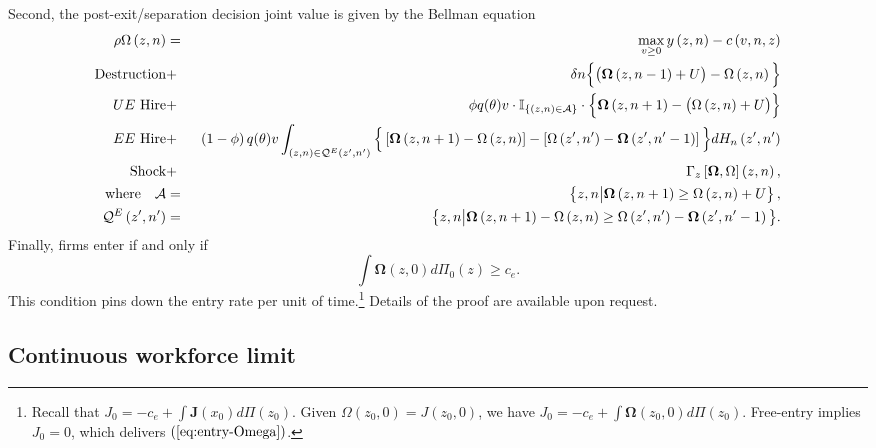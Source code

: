 Second, the post-exit/separation decision joint value is given by the
Bellman equation
\begin{eqnarray*}
\rho \Omega \left( z,n\right) &=& \max_{v\geq 0} y\left( z,n\right) -c\left(
v,n,z\right)  \label{eq:D_omega2} \\
\text{Destruction} &+&\:\:\delta n\Big\{ \big(\bm{\Omega }\left(
z,n-1\right) +U\big) - \Omega\left(z,n\right)\Big\}  \notag \\
\text{$UE$ Hire} &+&\:\:\phi q(\theta)v \cdot\mathbb{I}_{\left\{ \left(
z,n\right) \in \mathcal{A}\right\} }\cdot\Big\{ \bm{\Omega }\left(
z,n+1\right) -\big(\Omega \left( z,n\right)+U\big)\Big\}  \notag \\
\text{$EE$ Hire} &+&\:\:\left( 1-\phi \right)q(\theta)v \int_{\left(
z,n\right) \in \mathcal{Q}^E\left( z^{\prime },n^{\prime }\right) }\Big\{%
\left[ \bm{\Omega }\left(z, n+1\right) -\Omega \left( z,n\right) \right]
-\left[ \Omega \left( z^{\prime },n^{\prime }\right) -\bm{\Omega }\left(
z^{\prime },n^{\prime }-1\right) \right] \Big\}dH_n\left( z^{\prime
},n^{\prime }\right)  \notag \\
\text{Shock} &+&\:\:{\Gamma}_{z}\left[ \bm{\Omega },\Omega \right]
\left( z,n\right),  \notag  \\
\text{where}\quad\mathcal{A}&=&\left\{ z,n\big|\bm{\Omega }\left(
z,n+1\right) \geq \Omega \left( z,n\right)+U\right\},  \notag \\
\mathcal{Q}^{E}\left( z^{\prime },n^{\prime }\right) &=&\big\{ z,n\big|%
\bm{\Omega }\left(z, n+1\right) -\Omega \left( z,n\right) \geq \Omega
\left( z^{\prime },n^{\prime }\right) -\bm{\Omega }\left( z^{\prime
},n^{\prime }-1\right) \big\} .  \notag
\end{eqnarray*}
Finally, firms enter if and only if
\begin{equation}  \label{eq:entry-Omega}
\int \bm{\Omega }\left( z,0\right) d\Pi _{0}(z)\geq c_e.
\end{equation}%
This condition pins down the entry rate per unit of time.\footnote{%
Recall that $J_0 = -c_e + \int \bm{J}(x_0)d\Pi(z_0)$. Given $%
\Omega(z_0,0) = J(z_0,0)$, we have $J_0 = -c_e + \int \bm{\Omega}%
(z_0,0)d\Pi(z_0)$. Free-entry implies $J_0=0$, which delivers $(\ref%
{eq:entry-Omega})$.} Details of the proof are available upon request.

\subsection{Continuous workforce limit}

